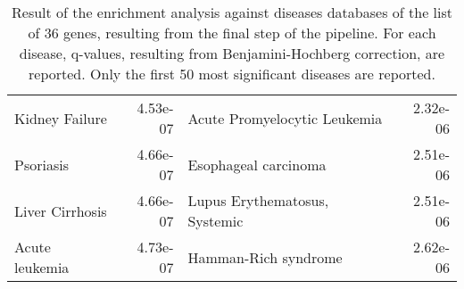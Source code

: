 \documentclass[fleqn,10pt]{SelfArx} %
\begin{document}
\begin{table}[ht]
\begin{tabularx}{\textwidth}{lRlR}
		Kidney Failure & 4.53e-07 & Acute Promyelocytic Leukemia & 2.32e-06 \\ 
		Psoriasis & 4.66e-07 & Esophageal carcinoma & 2.51e-06 \\ 
		Liver Cirrhosis & 4.66e-07 & Lupus Erythematosus, Systemic & 2.51e-06 \\ 
		Acute leukemia & 4.73e-07 & Hamman-Rich syndrome & 2.62e-06 \\ 
	\end{tabularx}
	\smallskip
	\caption{Result of the enrichment analysis against diseases databases of the list of 36 genes, resulting from the final step of the pipeline. For each disease, q-values, resulting from Benjamini-Hochberg correction, are reported. Only the first 50 most significant diseases are reported.}
	\label{tab:diseases36}
\end{table}
\end{document}
